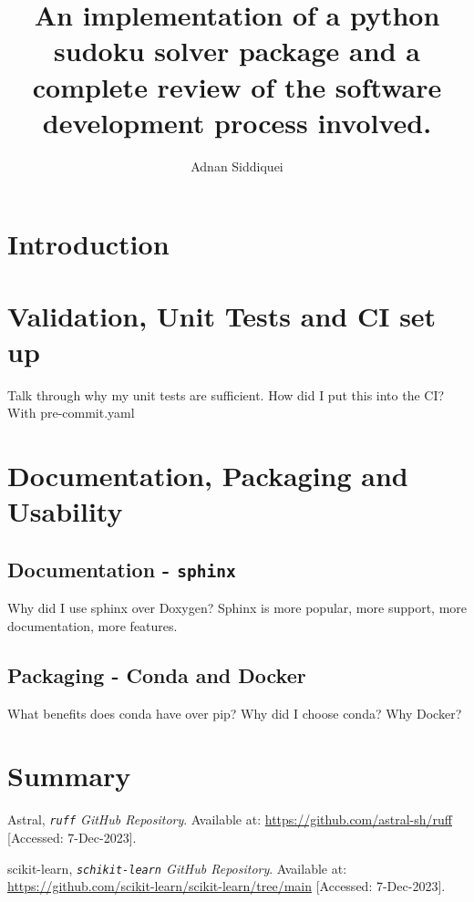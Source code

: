 \documentclass[a4paper,11pt]{article}
\title{\boldmath An implementation of a python sudoku solver package and a complete review of the software development
process involved.}
\author{Adnan Siddiquei}
\affiliation{University of Cambridge}
\newcommand{\inlinecode}[1]{\lstinline{#1}}
\begin{document}
\maketitle
\flushbottom

\section{Introduction}\label{sec:intro}






\section{Validation, Unit Tests and CI set up}\label{sec:validation-unit-tests-and-ci-set-up}
Talk through why my unit tests are sufficient.
How did I put this into the CI? With pre-commit.yaml


\section{Documentation, Packaging and Usability}\label{sec:documentation-packaging-and-usability}
\subsection{Documentation - \inlinecode{sphinx}}\label{subsec:documentation-sphinx}
Why did I use sphinx over Doxygen? Sphinx is more popular, more support, more documentation, more features.

\subsection{Packaging - Conda and Docker}\label{subsec:packaging-pypi}
What benefits does conda have over pip? Why did I choose conda?
Why Docker?

\section{Summary}
\label{sec:conclusion}


\begin{thebibliography}{99}

Astral,
\textit{\inlinecode{ruff} GitHub Repository}.
Available at: \url{https://github.com/astral-sh/ruff}
[Accessed: 7-Dec-2023].

scikit-learn,
\textit{\inlinecode{schikit-learn} GitHub Repository}.
Available at: \url{https://github.com/scikit-learn/scikit-learn/tree/main}
[Accessed: 7-Dec-2023].

\end{thebibliography}
\end{document}
